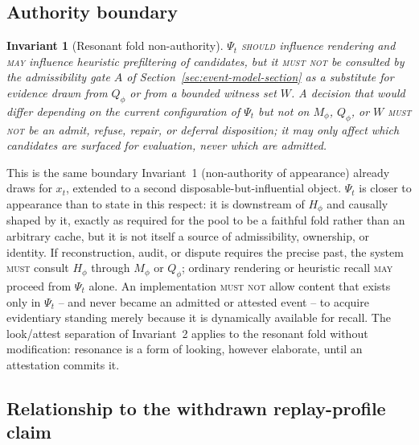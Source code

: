 \documentclass[11pt]{article}
\newtheorem{invariant}{Invariant}
\newcommand{\MUST}{\textsc{must}}
\newcommand{\MUSTNOT}{\textsc{must not}}
\newcommand{\SHOULD}{\textsc{should}}
\newcommand{\MAY}{\textsc{may}}
\begin{document}
\subsection{Authority boundary}

\begin{invariant}[Resonant fold non-authority]
\label{inv:resonant-non-authority}
$\Psi_t$ \SHOULD{} influence rendering and \MAY{} influence heuristic prefiltering of candidates, but it \MUSTNOT{} be consulted by the admissibility gate $A$ of Section~\ref{sec:event-model-section} as a substitute for evidence drawn from $Q_\phi$ or from a bounded witness set $W$. A decision that would differ depending on the current configuration of $\Psi_t$ but not on $M_\phi$, $Q_\phi$, or $W$ \MUSTNOT{} be an admit, refuse, repair, or deferral disposition; it may only affect which candidates are surfaced for evaluation, never which are admitted.
\end{invariant}

This is the same boundary Invariant~1 (non-authority of appearance) already draws for $x_t$, extended to a second disposable-but-influential object. $\Psi_t$ is closer to appearance than to state in this respect: it is downstream of $H_\phi$ and causally shaped by it, exactly as required for the pool to be a faithful fold rather than an arbitrary cache, but it is not itself a source of admissibility, ownership, or identity. If reconstruction, audit, or dispute requires the precise past, the system \MUST{} consult $H_\phi$ through $M_\phi$ or $Q_\phi$; ordinary rendering or heuristic recall \MAY{} proceed from $\Psi_t$ alone. An implementation \MUSTNOT{} allow content that exists only in $\Psi_t$ -- and never became an admitted or attested event -- to acquire evidentiary standing merely because it is dynamically available for recall. The look/attest separation of Invariant~2 applies to the resonant fold without modification: resonance is a form of looking, however elaborate, until an attestation commits it.

\subsection{Relationship to the withdrawn replay-profile claim}
\end{document}
